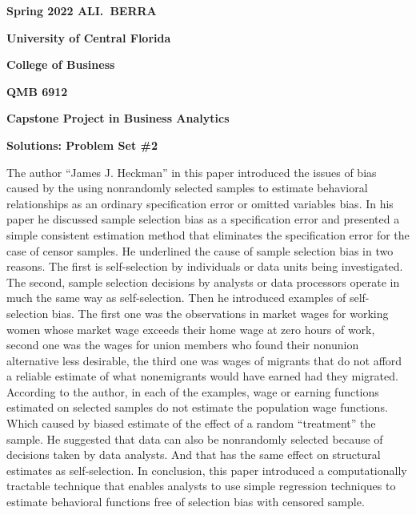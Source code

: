 \documentclass[12pt]{book}
\begin{document}
\pagestyle{empty}



{\noindent\bf Spring 2022 \hfill ALI.~BERRA}



\vskip 16pt



\centerline{\bf University of Central Florida}



\centerline{\bf College of Business}



\vskip 16pt



\centerline{\bf QMB 6912}



\centerline{\bf Capstone Project in Business Analytics}



\vskip 10pt



\centerline{\bf Solutions: Problem Set \#2}



\vskip 32pt
The author “James J. Heckman” in this paper introduced the issues of bias caused by the using nonrandomly selected samples to estimate behavioral relationships as an ordinary specification error or omitted variables bias. 
\vskip 12pt
In his paper he discussed sample selection bias as a specification error and presented a simple consistent estimation method that eliminates the specification error for the case of censor samples. 
\vskip 12pt
He underlined the cause of sample selection bias in two reasons. The first is self-selection by individuals or data units being investigated. The second, sample selection decisions by analysts or data processors operate in much the same way as self-selection.  
\vskip 12pt
Then he introduced examples of self-selection bias. The first one was the observations in market wages for working women whose market wage exceeds their home wage at zero hours of work, second one was the wages for union members who found their nonunion alternative less desirable, the third one was wages of migrants that do not afford a reliable estimate of what nonemigrants would have earned had they migrated.
\vskip 12pt
According to the author, in each of the examples, wage or earning functions estimated on selected samples do not estimate the population wage functions.  Which caused by biased estimate of the effect of a random “treatment” the sample.  
\vskip 12pt
He suggested that data can also be nonrandomly selected because of decisions taken by data analysts.  And that has the same effect on structural estimates as self-selection.
\vskip 12pt
 In conclusion, this paper introduced a computationally tractable technique that enables analysts to use simple regression techniques to estimate behavioral functions free of selection bias with censored sample. 
 
\end{document}
